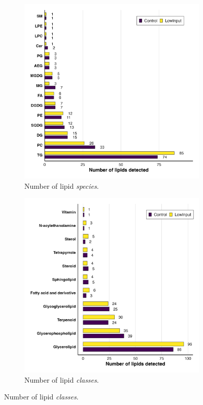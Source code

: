 \documentclass[10pt,letterpaper]{article}
\begin{document}
\begin{figure}[htp]
  \centering

  \begin{subfigure}[t]{0.48\textwidth}
    \includegraphics[width=\linewidth]{fig/supp/SuppFig_3A_Lipid_Counts}
    \caption{Number of lipid \textit{species}.}
    \label{fig:S3A}
  \end{subfigure}\hfill
  \begin{subfigure}[t]{0.48\textwidth}
    \includegraphics[width=\linewidth]{fig/supp/SuppFig_3B_Lipid_Class_Counts}
    \caption{Number of lipid \textit{classes}.}
    \label{fig:S3B}
  \end{subfigure}


\end{figure}
\end{document}
